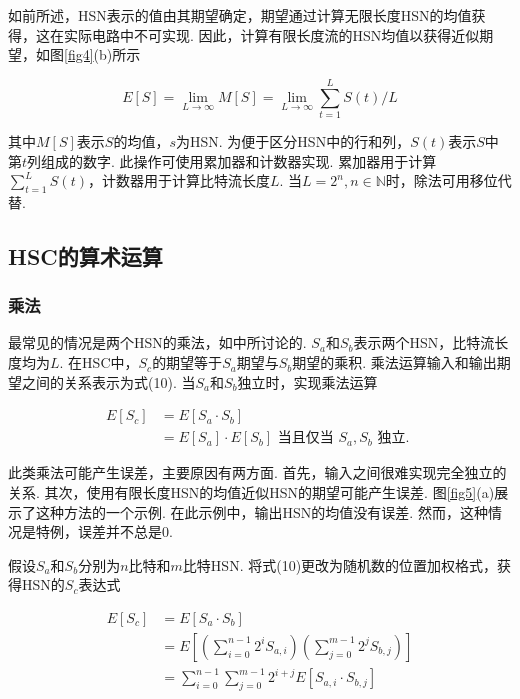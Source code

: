 \documentclass{solitairemiya-art}
\begin{document}
如前所述，HSN表示的值由其期望确定，期望通过计算无限长度HSN的均值获得，这在实际电路中不可实现. 因此，计算有限长度流的HSN均值以获得近似期望，如图\ref{fig4}(b)所示

\begin{equation}
E[S] = \lim_{L \to \infty} M[S] = \lim_{L \to \infty} \sum_{t=1}^{L} S(t) / L
\end{equation}

其中$M[S]$表示$S$的均值，$s$为HSN. 为便于区分HSN中的行和列，$S(t)$表示$S$中第$t$列组成的数字. 此操作可使用累加器和计数器实现. 累加器用于计算$\sum_{t=1}^{L} S(t)$，计数器用于计算比特流长度$L$. 当$L = 2^n, n \in \mathbb{N}$时，除法可用移位代替. 

\subsection{HSC的算术运算}

\subsubsection{乘法}

最常见的情况是两个HSN的乘法，如\cite{ref29}中所讨论的. $S_a$和$S_b$表示两个HSN，比特流长度均为$L$. 在HSC中，$S_c$的期望等于$S_a$期望与$S_b$期望的乘积. 乘法运算输入和输出期望之间的关系表示为式(10). 当$S_a$和$S_b$独立时，实现乘法运算

\begin{equation}
\begin{aligned}
E[S_c] &= E[S_a \cdot S_b] \\
&= E\left[S_a\right] \cdot E\left[S_b\right] \text{ 当且仅当 } S_a, S_b \text{ 独立. }
\end{aligned}
\end{equation}

此类乘法可能产生误差，主要原因有两方面. 首先，输入之间很难实现完全独立的关系. 其次，使用有限长度HSN的均值近似HSN的期望可能产生误差. 图\ref{fig5}(a)展示了这种方法的一个示例. 在此示例中，输出HSN的均值没有误差. 然而，这种情况是特例，误差并不总是0. 

假设$S_a$和$S_b$分别为$n$比特和$m$比特HSN. 将式(10)更改为随机数的位置加权格式，获得HSN的$S_c$表达式

\begin{equation}
\begin{aligned}
E\left[S_c\right] &= E\left[S_a \cdot S_b\right] \\
&= E\left[\left(\sum_{i=0}^{n-1} 2^i S_{a,i}\right) \left(\sum_{j=0}^{m-1} 2^j S_{b,j}\right)\right] \\
&= \sum_{i=0}^{n-1} \sum_{j=0}^{m-1} 2^{i+j} E\left[S_{a,i} \cdot S_{b,j}\right]
\end{aligned}
\end{equation}
\end{document}
